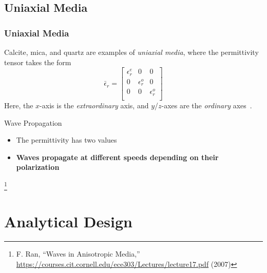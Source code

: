 \documentclass[aspectratio=169,t,xcolor=table]{beamer}
\newcommand\blfootnote[1]{%
  \begingroup
  \renewcommand\thefootnote{}\footnote[frame]{\tiny #1}%
  \addtocounter{footnote}{-1}%
  \endgroup
}
\begin{document}
\subsection{Uniaxial Media}
\begin{frame}
    \frametitle{Uniaxial Media}
    Calcite, mica, and quartz are examples of \textit{uniaxial media}, where
    the permittivity tensor takes the form
    \begin{equation}\label{eq:PT_UA}
    \bar{\epsilon}_r = \begin{bmatrix}
        \epsilon^e_r & 0 & 0\\
        0 & \epsilon^o_r & 0\\
       0 & 0 & \epsilon^o_r\\
    \end{bmatrix}
\end{equation}\pause
Here, the $x$-axis is the \textit{extraordinary} axis, and $y$/$z$-axes 
are the \textit{ordinary} axes~\cite{Wav_anis}.\\
\vspace{1em}
\begin{block}{Wave Propagation}
    \begin{itemize}
        \item The permittivity has two values
        \item \textbf{Waves propagate at different speeds depending on their 
        polarization}
    \end{itemize}
\end{block}
\blfootnote{
        \cite{Wav_anis} F. Ran, ``Waves in Anisotropic Media,''
        \url{https://courses.cit.cornell.edu/ece303/Lectures/lecture17.pdf} (2007)
    }
\end{frame}

\section{Analytical Design}
\end{document}
